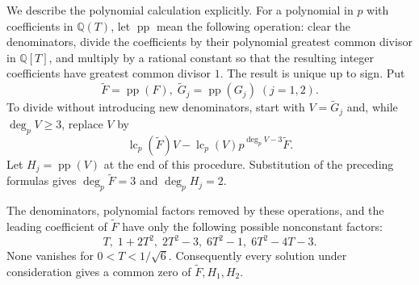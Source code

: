 \documentclass[11pt]{article}
\theoremstyle{definition}
\theoremstyle{remark}
\DeclareMathOperator{\pp}{pp}
\begin{document}
\begin{appendices}
We describe the polynomial calculation explicitly. For a polynomial in $p$ with coefficients in $\mathbb Q(T)$, let $\pp$ mean the following operation: clear the denominators, divide the coefficients by their polynomial greatest common divisor in $\mathbb Q[T]$, and multiply by a rational constant so that the resulting integer coefficients have greatest common divisor $1$. The result is unique up to sign. Put
\[
\widetilde F=\pp(F),\; \widetilde G_j=\pp(G_j)\;(j=1,2).
\]
To divide without introducing new denominators, start with $V=\widetilde G_j$ and, while $\deg_p V\ge3$, replace $V$ by
\[
\operatorname{lc}_p(\widetilde F)V
-\operatorname{lc}_p(V)p^{\deg_p V-3}\widetilde F.
\]
Let $H_j=\pp(V)$ at the end of this procedure. Substitution of the preceding formulas gives $\deg_p\widetilde F=3$ and $\deg_pH_j=2$.

The denominators, polynomial factors removed by these operations, and the leading coefficient of $\widetilde F$ have only the following possible nonconstant factors:
\[
T,\; 1+2T^2,\; 2T^2-3,\; 6T^2-1,\; 6T^2-4T-3.
\]
None vanishes for $0<T<1/\sqrt6$. Consequently every solution under consideration gives a common zero of $\widetilde F,H_1,H_2$.


\end{appendices}
\end{document}
